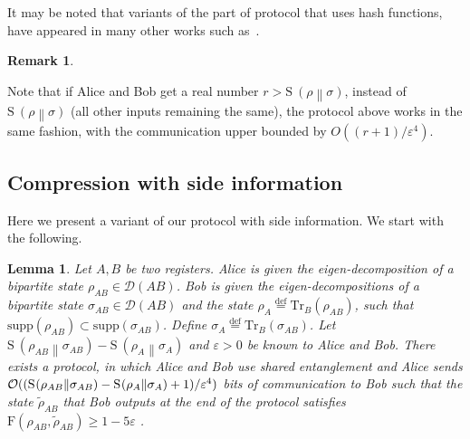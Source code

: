 \documentclass[11pt,a4paper]{article}
\def\F{\mathrn{F}}
\def\O{\CMcal{O}}
\theoremstyle{plain}
\newtheorem{lemma}[theorem]{Lemma}
\theoremstyle{definition}
\newtheorem{remark}[theorem]{Remark}
\newcommand {\br} [1] {\ensuremath{ \left( #1 \right) }}
\newcommand {\minusspace} {\: \! \!}
\newcommand {\fn} [2] {\ensuremath{ #1 \minusspace \br{ #2 } }}
\newcommand {\defeq} {\ensuremath{ \stackrel{\mathrm{def}}{=} }}
\newcommand {\relent} [2] {\fn{\mathrm{S}}{#1 \middle\| #2}}
\newcommand {\Tr} {\ensuremath{ \mathrm{Tr} }}
\def\ve{{\varepsilon}}
\def\F{\mathrm{F}}
\begin{document}
It may be noted that variants of the part of protocol that uses hash functions, have appeared in many other works such as~\cite{Braverman2011,Kerenidis2012}.


\begin{remark}
\label{qbevremark}

Note that if Alice and Bob get a real number $r> \relent{\rho}{\sigma}$, instead of $\relent{\rho}{\sigma}$ (all other inputs remaining the same), the protocol above works in the same fashion, with the communication upper bounded by $O((r+1)/\ve^4)$.
\end{remark}

\subsection{Compression with side information}
Here we present a variant of our protocol with side information. We start with the following.
\begin{lemma}
\label{lem:withsideinf}
Let $A,B$ be two registers. Alice is given the eigen-decomposition of a bipartite state $\rho_{AB} \in \mathcal{D}(AB)$. Bob is given the eigen-decompositions of a bipartite state $\sigma_{AB}\in \mathcal{D}(AB)$ and the state $\rho_A\defeq \Tr_{B}(\rho_{AB})$, such that $\text{supp}(\rho_{AB})\subset \text{supp}(\sigma_{AB})$. Define $\sigma_A\defeq\Tr_{B}(\sigma_{AB})$. Let  $\relent{\rho_{AB}}{\sigma_{AB}}-\relent{\rho_A}{\sigma_A}$ and $\ve >0$ be known to Alice and Bob. There exists a protocol, in which Alice and Bob use shared entanglement and Alice sends $\O((\relent{\rho_{AB}}{\sigma_{AB}}-\relent{\rho_A}{\sigma_A}+1)/\ve^4)$ bits of communication to Bob such that the state $\tilde{\rho}_{AB}$ that Bob outputs at the end of the protocol satisfies  $\F(\rho_{AB},\tilde{\rho}_{AB})\geq 1-5\ve$ .
\end{lemma}
\end{document}
